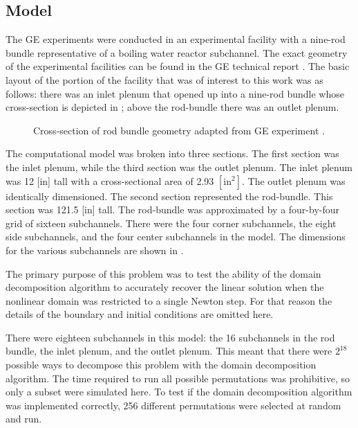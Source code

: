 \subsection{Model}
\label{sect:complexModel}

The GE experiments were conducted in an experimental facility with a nine-rod bundle representative of a boiling water reactor subchannel.
The exact geometry of the experimental facilities can be found in the GE technical report \cite{Lahey1970}.
The basic layout of the portion of the facility that was of interest to this work was as follows: there was an inlet plenum that opened up into a nine-rod bundle whose cross-section is depicted in ; above the rod-bundle there was an outlet plenum.

\begin{figure}[h!tb]
\centering

\caption{Cross-section of rod bundle geometry adapted from GE experiment \cite{Lahey1970}.}
\label{fig:channel_layout}
\end{figure}

The computational model was broken into three sections.
The first section was the inlet plenum, while the third section was the outlet plenum.
The inlet plenum was 12 [in] tall with a cross-sectional area of 2.93 $[ \text{in}^2]$.
The outlet plenum was identically dimensioned.
The second section represented the rod-bundle.
This section was 121.5 [in] tall.
The rod-bundle was approximated by a four-by-four grid of sixteen subchannels.
There were the four corner subchannels, the eight side subchannels, and the four center subchannels in the model.
The dimensions for the various subchannels are shown in .

The primary purpose of this problem was to test the ability of the domain decomposition algorithm to accurately recover the linear solution when the nonlinear domain was restricted to a single Newton step.
For that reason the details of the boundary and initial conditions are omitted here.

There were eighteen subchannels in this model: the 16 subchannels in the rod bundle, the inlet plenum, and the outlet plenum.
This meant that there were $2^{18}$ possible ways to decompose this problem with the domain decomposition algorithm.
The time required to run all possible permutations was prohibitive, so only a subset were simulated here.
To test if the domain decomposition algorithm was implemented correctly, 256 different permutations were selected at random and run.


